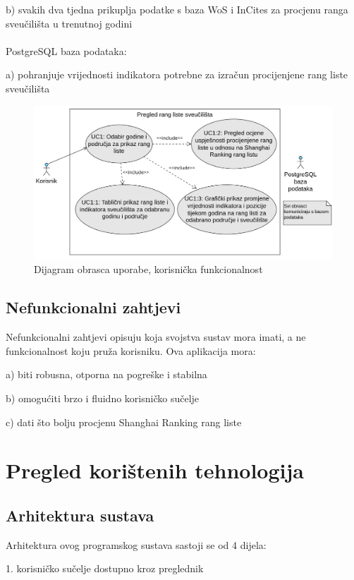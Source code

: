 \documentclass[times, utf8, zavrsni]{fer}
\begin{document}
b) svakih dva tjedna prikuplja podatke s baza WoS i InCites za procjenu ranga sveučilišta u trenutnoj godini
\\
\\PostgreSQL baza podataka:
 
a) pohranjuje vrijednosti indikatora potrebne za izračun procijenjene rang liste sveučilišta
\\
\begin{figure}[htb]
    \hspace*{-2cm}
    \includegraphics[scale=0.4]{slika1.png}
    \caption{Dijagram obrasca uporabe, korisnička funkcionalnost}
    \label{fig:korisnik}
    \end{figure}
\newpage
\section{Nefunkcionalni zahtjevi}
Nefunkcionalni zahtjevi opisuju koja svojstva sustav mora imati, a ne funkcionalnost koju pruža korisniku. Ova aplikacija mora:

a) biti robusna, otporna na pogreške i stabilna

b) omogućiti brzo i fluidno korisničko sučelje

c) dati što bolju procjenu Shanghai Ranking rang liste

\chapter{Pregled korištenih tehnologija}
\section{Arhitektura sustava}
\label{arhitektura}
Arhitektura ovog programskog sustava sastoji se od 4 dijela:

1. korisničko sučelje dostupno kroz preglednik
\end{document}
